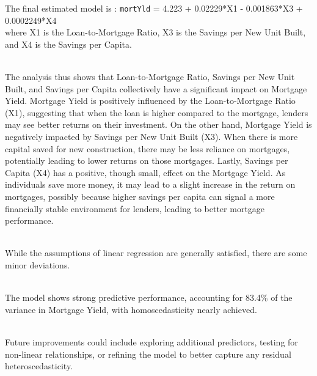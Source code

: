 \documentclass[
  11pt,
]{article}
\begin{document}
\hfill\break
The final estimated model is : \texttt{mortYld} = 4.223 + 0.02229*X1 -
0.001863*X3 + 0.0002249*X4\\
where X1 is the Loan-to-Mortgage Ratio, X3 is the Savings per New Unit
Built, and X4 is the Savings per Capita.\\
\strut \\
The analysis thus shows that Loan-to-Mortgage Ratio, Savings per New
Unit Built, and Savings per Capita collectively have a significant
impact on Mortgage Yield. Mortgage Yield is positively influenced by the
Loan-to-Mortgage Ratio (X1), suggesting that when the loan is higher
compared to the mortgage, lenders may see better returns on their
investment. On the other hand, Mortgage Yield is negatively impacted by
Savings per New Unit Built (X3). When there is more capital saved for
new construction, there may be less reliance on mortgages, potentially
leading to lower returns on those mortgages. Lastly, Savings per Capita
(X4) has a positive, though small, effect on the Mortgage Yield. As
individuals save more money, it may lead to a slight increase in the
return on mortgages, possibly because higher savings per capita can
signal a more financially stable environment for lenders, leading to
better mortgage performance.\\
\strut \\
While the assumptions of linear regression are generally satisfied,
there are some minor deviations.\\
\strut \\
The model shows strong predictive performance, accounting for 83.4\% of
the variance in Mortgage Yield, with homoscedasticity nearly achieved.\\
\strut \\
Future improvements could include exploring additional predictors,
testing for non-linear relationships, or refining the model to better
capture any residual heteroscedasticity.
\end{document}

